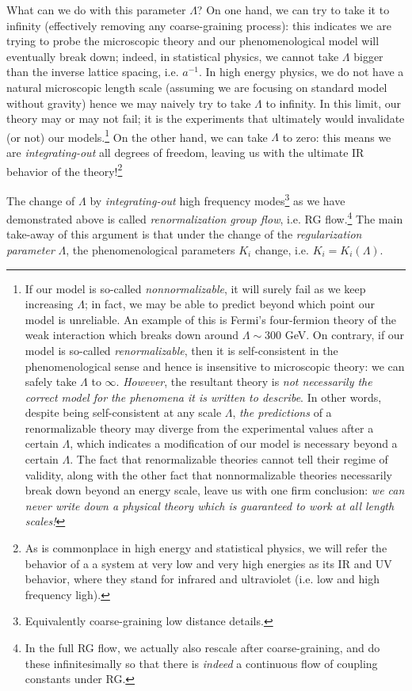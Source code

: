 \documentclass[12pt]{article}
\numberwithin{equation}{section}
\begin{document}
What can we do with this parameter $\Lambda$? On one hand, we can try to take it to infinity (effectively removing any coarse-graining process): this indicates we are trying to probe the microscopic theory and our phenomenological model will eventually break down; indeed, in statistical physics, we cannot take $\Lambda$ bigger than the inverse lattice spacing, i.e. $a^{-1}$. In high energy physics, we do not have a natural microscopic length scale (assuming we are focusing on standard model without gravity) hence we may naively try to take $\Lambda$ to infinity. In this limit, our theory may or may not fail; it is the experiments that ultimately would invalidate (or not) our models.\footnote{\label{footnote: normalizable vs nonnormalizable}
If our model is so-called \emph{nonnormalizable}, it will surely fail as we keep increasing $\Lambda$; in fact, we may be able to predict beyond which point our model is unreliable. An example of this is Fermi's  four-fermion theory of the weak interaction which breaks down around $\Lambda\sim 300$ GeV. On contrary, if our model is so-called \emph{renormalizable}, then it is self-consistent in the phenomenological sense and hence is insensitive to microscopic theory: we can safely take $\Lambda$ to $\infty$. \emph{However}, the resultant theory is \emph{not necessarily the correct model for the phenomena it is written to describe}. In other words, despite being self-consistent at any scale $\Lambda$, \emph{the predictions} of a renormalizable theory may diverge from the experimental values after a certain $\Lambda$, which indicates a modification of our model is necessary beyond a certain $\Lambda$. The fact that renormalizable theories cannot tell their regime of validity, along with the other fact that nonnormalizable theories necessarily break down beyond an energy scale, leave us with one firm conclusion: \emph{we can never write down a physical theory which is guaranteed to work at all length scales!}
} On the other hand, we can take $\Lambda$ to zero: this means we are \emph{integrating-out} all degrees of freedom, leaving us with the ultimate IR behavior of the theory!\footnote{
As is commonplace in high energy and statistical physics, we will refer the behavior of a a system at very low and very high energies as its IR and UV behavior, where they stand for infrared and ultraviolet (i.e. low and high frequency ligh).
}

The change of $\Lambda$ by \emph{integrating-out} high frequency modes\footnote{Equivalently coarse-graining low distance details.} as we have demonstrated above is called \emph{renormalization group flow}, i.e. RG flow.\footnote{In the full RG flow, we actually also rescale after coarse-graining, and do these infinitesimally so that there is \emph{indeed} a continuous flow of coupling constants under RG.} The main take-away of this argument is that under the change of the \emph{regularization parameter} $\Lambda$, the phenomenological parameters $K_i$ change, i.e. $K_i=K_i(\Lambda)$.
\end{document}

